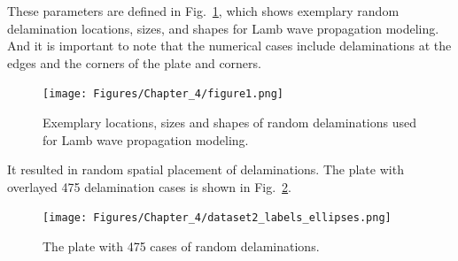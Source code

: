 These parameters are defined in Fig.~\ref{fig:random_delaminations}, which shows exemplary random delamination locations, sizes, and shapes for Lamb wave propagation modeling.
And it is important to note that the numerical cases include delaminations at the edges and the corners of the plate and corners.
\begin{figure}[!h]
	\centering
	\texttt{[image: Figures/Chapter\_4/figure1.png]}
	\caption{Exemplary locations, sizes and shapes of random delaminations used for Lamb wave propagation modeling.}
	\label{fig:random_delaminations}
\end{figure}

It resulted in random spatial placement of delaminations. The plate with overlayed 475 delamination cases is shown in Fig.~\ref{fig:random_delam}.
\begin{figure}
	\centering
	\texttt{[image: Figures/Chapter\_4/dataset2\_labels\_ellipses.png]}
	\caption{The plate with 475 cases of random delaminations.}
	\label{fig:random_delam}
\end{figure}

